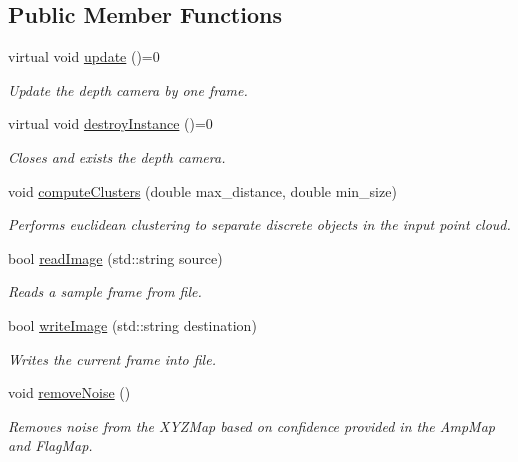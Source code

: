\subsection*{Public Member Functions}
\begin{DoxyCompactItemize}
\item 
virtual void \hyperlink{class_depth_camera_abae1b9f37a00b17f00ff983ebb43ffc5}{update} ()=0
\begin{DoxyCompactList}\small\item\em Update the depth camera by one frame. \end{DoxyCompactList}\item 
virtual void \hyperlink{class_depth_camera_aaf7c09a863e906f61104f23af10a8597}{destroy\+Instance} ()=0
\begin{DoxyCompactList}\small\item\em Closes and exists the depth camera. \end{DoxyCompactList}\item 
void \hyperlink{class_depth_camera_a009719ec313de883b617903360bdf519}{compute\+Clusters} (double max\+\_\+distance, double min\+\_\+size)
\begin{DoxyCompactList}\small\item\em Performs euclidean clustering to separate discrete objects in the input point cloud. \end{DoxyCompactList}\item 
bool \hyperlink{class_depth_camera_a21cf887a447d2cdfda6ac907662c55fe}{read\+Image} (std\+::string source)
\begin{DoxyCompactList}\small\item\em Reads a sample frame from file. \end{DoxyCompactList}\item 
bool \hyperlink{class_depth_camera_a599dceaab9e673762b9ab76cf1e4f413}{write\+Image} (std\+::string destination)
\begin{DoxyCompactList}\small\item\em Writes the current frame into file. \end{DoxyCompactList}\item 
\hypertarget{class_depth_camera_adc06db6509cc5f47de1e168f56bf41fa}{}\label{class_depth_camera_adc06db6509cc5f47de1e168f56bf41fa} 
void \hyperlink{class_depth_camera_adc06db6509cc5f47de1e168f56bf41fa}{remove\+Noise} ()
\begin{DoxyCompactList}\small\item\em Removes noise from the X\+Y\+Z\+Map based on confidence provided in the Amp\+Map and Flag\+Map. \end{DoxyCompactList}\item 

\end{DoxyCompactItemize}
